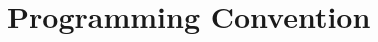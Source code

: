 \documentclass[../main.tex]{subfiles}
\begin{document}
    \section{Programming Convention}
\end{document}
